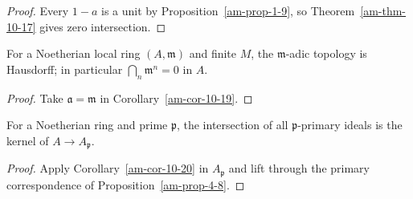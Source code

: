 \begin{proof}
Every $1-a$ is a unit by Proposition~\ref{am-prop-1-9}, so
Theorem~\ref{am-thm-10-17} gives zero intersection.
\end{proof}
\begin{corollary}
\label{am-cor-10-20}
\uses{}
For a Noetherian local ring $(A,\mathfrak{m})$ and finite $M$, the $\mathfrak{m}$-adic topology is
Hausdorff; in particular $\bigcap_n\mathfrak{m}^n=0$ in $A$.
\end{corollary}
\begin{proof}
Take $\mathfrak{a}=\mathfrak{m}$ in Corollary~\ref{am-cor-10-19}.
\end{proof}
\begin{corollary}
\label{am-cor-10-21}
\uses{}
For a Noetherian ring and prime $\mathfrak{p}$, the intersection of all $\mathfrak{p}$-primary
ideals is the kernel of $A\to A_\mathfrak{p}$.
\end{corollary}
\begin{proof}
Apply Corollary~\ref{am-cor-10-20} in $A_\mathfrak{p}$ and lift through the primary
correspondence of Proposition~\ref{am-prop-4-8}.
\end{proof}

